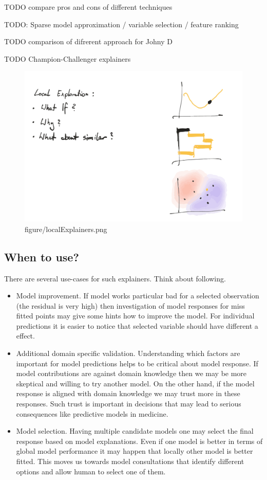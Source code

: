 \documentclass[12pt,]{krantz}
\providecommand{\tightlist}{%
  \setlength{\itemsep}{0pt}\setlength{\parskip}{0pt}}
\theoremstyle{definition}
\theoremstyle{definition}
\theoremstyle{definition}
\theoremstyle{remark}
\begin{document}
TODO compare pros and cons of different techniques

TODO: Sparse model approximation / variable selection / feature ranking

TODO comparison of difrerent approach for Johny D

TODO Champion-Challenger explainers

\begin{figure}
\centering
\includegraphics{figure/localExplainers.png}
\caption{figure/localExplainers.png}
\end{figure}

\hypertarget{when-to-use}{%
\subsection{When to use?}\label{when-to-use}}

There are several use-cases for such explainers. Think about following.

\begin{itemize}
\tightlist
\item
  Model improvement. If model works particular bad for a selected
  observation (the residual is very high) then investigation of model
  responses for miss fitted points may give some hints how to improve
  the model. For individual predictions it is easier to notice that
  selected variable should have different a effect.
\item
  Additional domain specific validation. Understanding which factors are
  important for model predictions helps to be critical about model
  response. If model contributions are against domain knowledge then we
  may be more skeptical and willing to try another model. On the other
  hand, if the model response is aligned with domain knowledge we may
  trust more in these responses. Such trust is important in decisions
  that may lead to serious consequences like predictive models in
  medicine.
\item
  Model selection. Having multiple candidate models one may select the
  final response based on model explanations. Even if one model is
  better in terms of global model performance it may happen that locally
  other model is better fitted. This moves us towards model
  consultations that identify different options and allow human to
  select one of them.
\end{itemize}
\end{document}
